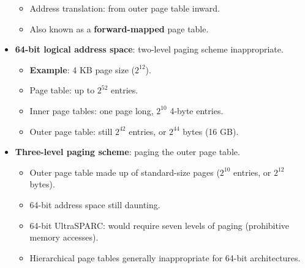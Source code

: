 \begin{itemize}
\begin{itemize}
        \item Address translation: from outer page table inward.
        \item Also known as a \textbf{forward-mapped} page table.
    \end{itemize}
    \item \textbf{64-bit logical address space}: two-level paging scheme inappropriate.
    \begin{itemize}
        \item \textbf{Example}: 4 KB page size ($2^{12}$).
        \item Page table: up to $2^{52}$ entries.
        \item Inner page tables: one page long, $2^{10}$ 4-byte entries.
        \item Outer page table: still $2^{42}$ entries, or $2^{44}$ bytes (16 GB).
    \end{itemize}
    \item \textbf{Three-level paging scheme}: paging the outer page table.
    \begin{itemize}
        \item Outer page table made up of standard-size pages ($2^{10}$ entries, or $2^{12}$ bytes).
        \item 64-bit address space still daunting.
        \item 64-bit UltraSPARC: would require seven levels of paging (prohibitive memory accesses).
        \item Hierarchical page tables generally inappropriate for 64-bit architectures.
    \end{itemize}
\end{itemize}

